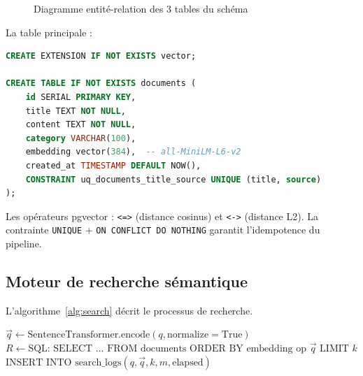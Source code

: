 \documentclass[12pt,a4paper]{article}
\begin{document}
\begin{figure}[H]
\caption{Diagramme entit\'{e}-relation des 3 tables du sch\'{e}ma}
\label{fig:erd}
\end{figure}

La table principale :

\begin{lstlisting}[language=SQL, caption={DDL de la table documents}]
CREATE EXTENSION IF NOT EXISTS vector;

CREATE TABLE IF NOT EXISTS documents (
    id SERIAL PRIMARY KEY,
    title TEXT NOT NULL,
    content TEXT NOT NULL,
    category VARCHAR(100),
    embedding vector(384),  -- all-MiniLM-L6-v2
    created_at TIMESTAMP DEFAULT NOW(),
    CONSTRAINT uq_documents_title_source UNIQUE (title, source)
);
\end{lstlisting}

Les op\'{e}rateurs pgvector : \texttt{<=>} (distance cosinus) et \texttt{<->} (distance L2). La contrainte \texttt{UNIQUE} + \texttt{ON CONFLICT DO NOTHING} garantit l'idempotence du pipeline.

\subsection{Moteur de recherche s\'{e}mantique}

L'algorithme~\ref{alg:search} d\'{e}crit le processus de recherche.

\begin{algorithm}[H]
\SetAlgoLined
{}
\BlankLine
$\vec{q} \leftarrow \text{SentenceTransformer.encode}(q, \text{normalize}=\text{True})$\;
$R \leftarrow \text{SQL: SELECT ... FROM documents ORDER BY embedding op } \vec{q} \text{ LIMIT } k$\;
$\text{INSERT INTO search\_logs}(q, \vec{q}, k, m, \text{elapsed})$\;
\caption{Recherche s\'{e}mantique via pgvector}
\label{alg:search}
\end{algorithm}
\end{document}
